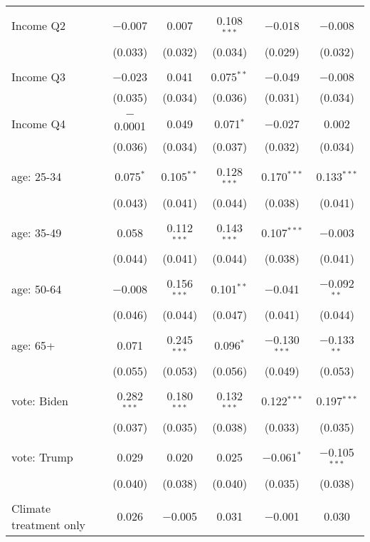 \begin{tabular}{@{\extracolsep{5pt}}lccccc}
  & & & & & \\ 
 Income Q2 & $-$0.007 & 0.007 & 0.108$^{***}$ & $-$0.018 & $-$0.008 \\ 
  & (0.033) & (0.032) & (0.034) & (0.029) & (0.032) \\ 
  & & & & & \\ 
 Income Q3 & $-$0.023 & 0.041 & 0.075$^{**}$ & $-$0.049 & $-$0.008 \\ 
  & (0.035) & (0.034) & (0.036) & (0.031) & (0.034) \\ 
  & & & & & \\ 
 Income Q4 & $-$0.0001 & 0.049 & 0.071$^{*}$ & $-$0.027 & 0.002 \\ 
  & (0.036) & (0.034) & (0.037) & (0.032) & (0.034) \\ 
  & & & & & \\ 
 age: 25-34 & 0.075$^{*}$ & 0.105$^{**}$ & 0.128$^{***}$ & 0.170$^{***}$ & 0.133$^{***}$ \\ 
  & (0.043) & (0.041) & (0.044) & (0.038) & (0.041) \\ 
  & & & & & \\ 
 age: 35-49 & 0.058 & 0.112$^{***}$ & 0.143$^{***}$ & 0.107$^{***}$ & $-$0.003 \\ 
  & (0.044) & (0.041) & (0.044) & (0.038) & (0.041) \\ 
  & & & & & \\ 
 age: 50-64 & $-$0.008 & 0.156$^{***}$ & 0.101$^{**}$ & $-$0.041 & $-$0.092$^{**}$ \\ 
  & (0.046) & (0.044) & (0.047) & (0.041) & (0.044) \\ 
  & & & & & \\ 
 age: 65+ & 0.071 & 0.245$^{***}$ & 0.096$^{*}$ & $-$0.130$^{***}$ & $-$0.133$^{**}$ \\ 
  & (0.055) & (0.053) & (0.056) & (0.049) & (0.053) \\ 
  & & & & & \\ 
 vote: Biden & 0.282$^{***}$ & 0.180$^{***}$ & 0.132$^{***}$ & 0.122$^{***}$ & 0.197$^{***}$ \\ 
  & (0.037) & (0.035) & (0.038) & (0.033) & (0.035) \\ 
  & & & & & \\ 
 vote: Trump & 0.029 & 0.020 & 0.025 & $-$0.061$^{*}$ & $-$0.105$^{***}$ \\ 
  & (0.040) & (0.038) & (0.040) & (0.035) & (0.038) \\ 
  & & & & & \\ 
 Climate treatment only & 0.026 & $-$0.005 & 0.031 & $-$0.001 & 0.030 \\ 

\end{tabular}
